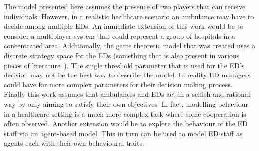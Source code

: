 The model presented here assumes the presence of two players that can receive 
individuals. 
However, in a realistic healthcare scenario an ambulance may have to decide 
among multiple EDs.
An immediate extension of this work would be to consider a multiplayer system
that could represent a group of hospitals in a concentrated area.
Additionally, the game theoretic model that was created uses a discrete 
strategy space for the EDs (something that is also present in various pieces of 
literature~\cite{deo2011centralized, knight2017measuring}).
The single threshold parameter that is used for the ED's decision may not be 
the best way to describe the model.
In reality ED managers could have far more complex parameters for their 
decision making process.
Finally this work assumes that ambulances and EDs act in a selfish and rational
way by only aiming to satisfy their own objectives.
In fact, modelling behaviour in a healthcare setting is a much more complex 
task where some cooperation is often observed.
Another extension would be to explore the behaviour of the ED staff via an 
agent-based model. 
This in turn can be used to model ED staff as agents each with their own 
behavioural traits.
